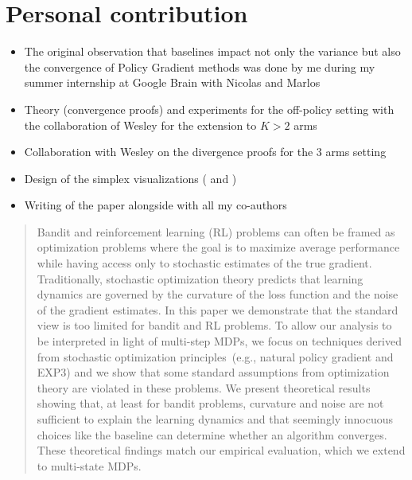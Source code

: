 \section*{Personal contribution}
\begin{itemize}
    \item The original observation that baselines impact not only the variance but also the convergence of Policy Gradient methods was done by me during my summer internship at Google Brain with Nicolas and Marlos
    \item Theory (convergence proofs) and experiments for the off-policy setting with the collaboration of Wesley for the extension to $K > 2$ arms
    \item Collaboration with Wesley on the divergence proofs for the 3 arms setting
    \item Design of the simplex visualizations ( and )
    \item Writing of the paper alongside with all my co-authors
\end{itemize}














\begin{abstract}


Bandit and reinforcement learning (RL) problems can often be framed as optimization problems where the goal is to maximize average performance while having access only to stochastic estimates of the true gradient. Traditionally, stochastic optimization theory predicts that learning dynamics are governed by the curvature of the loss function and the noise of the gradient estimates. In this paper we demonstrate that the standard view is too limited for bandit and RL problems. To allow our analysis to be interpreted in light of multi-step MDPs, we focus on techniques derived from stochastic optimization principles~(e.g., natural policy gradient and EXP3) and we show that some standard assumptions from optimization theory are violated in these problems. We present theoretical results showing that, at least for bandit problems, curvature and noise are not sufficient to explain the learning dynamics and that seemingly innocuous choices like the baseline can determine whether an algorithm converges. These theoretical findings match our empirical evaluation, which we extend to multi-state MDPs.
\end{abstract}

